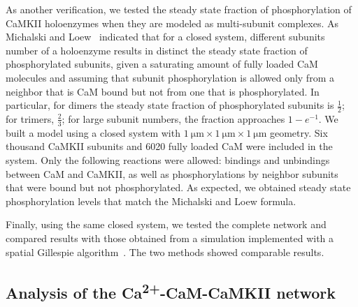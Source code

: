 \documentclass[10pt,letterpaper]{article}
\begin{document}
As another verification, we tested the steady state fraction of phosphorylation of CaMKII holoenzymes when they are modeled as multi-subunit complexes. As Michalski and Loew~\cite{Michalski:2012ds} indicated that for a closed system, different subunits number of a holoenzyme results in distinct the steady state fraction of phosphorylated subunits, given a saturating amount of fully loaded CaM molecules and assuming that subunit phosphorylation is allowed only from a neighbor that is CaM bound but not from one that is phosphorylated. In particular, for dimers the steady state fraction of phosphorylated subunits is $\frac{1}{2}$; for trimers, $\frac{2}{3}$; for large subunit numbers, the fraction approaches $1-e^{-1}$. We built a model using a closed system with $\SI{1}{\um}\times\SI{1}{\um}\times\SI{1}{\um}$ geometry. Six thousand CaMKII subunits and 6020 fully loaded CaM were included in the system. Only the following reactions were allowed: bindings and unbindings between CaM and CaMKII, as well as phosphorylations by neighbor subunits that were bound but not phosphorylated. As expected, we obtained steady state phosphorylation levels that match the Michalski and Loew formula.

Finally, using the same closed system, we tested the complete network and compared results with those obtained from a simulation implemented with a spatial Gillespie algorithm~\cite{Zeng:2010bq}. The two methods showed comparable results.

\subsection*{Analysis of the Ca\textsuperscript{2+}-CaM-CaMKII network}
\end{document}
